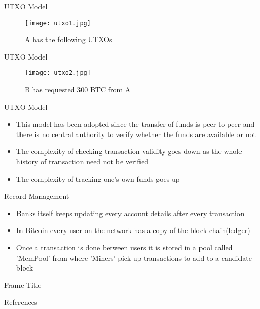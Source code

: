 \documentclass{beamer}
\begin{document}
\begin{frame}{UTXO Model}
 \begin{figure}[H]\centering 
\texttt{[image: utxo1.jpg]}
\caption{A has the following UTXOs}
\end{figure}   
\end{frame}
\begin{frame}{UTXO Model}
 \begin{figure}[H]\centering 
\texttt{[image: utxo2.jpg]}
\caption{B has requested 300 BTC from A}
\end{figure}   
\end{frame}
\begin{frame}{UTXO Model}
\begin{itemize}
    \item This model has been adopted since the transfer of funds is peer to peer and there is no central
authority to verify whether the funds are available or not
\item The complexity of checking transaction validity goes down as the whole history of transaction need not
be verified
\item The complexity of tracking one’s own funds goes up
\end{itemize}
    
\end{frame}
\begin{frame}{Record Management}
 \begin{itemize}
     \item Banks itself keeps updating every account details after every transaction
     \item In Bitcoin every user on the network has a copy of the block-chain(ledger)
     \item Once a transaction is done between users it is stored in a pool called 'MemPool' from where 'Miners' pick up transactions to add to a candidate block 
 \end{itemize}   
\end{frame}
\begin{frame}{Frame Title}
    
\end{frame}
\begin{frame}{References}
 
   
\end{frame}
\end{document}

